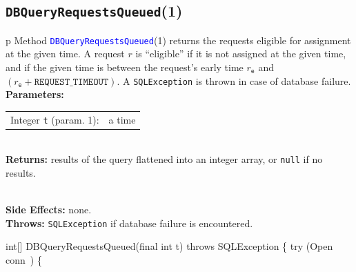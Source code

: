 \subsection{\texttt{DBQueryRequestsQueued}(1)}
\begin{tabular}{p{\textwidth}}
\toprule
{}
Method \textcolor{blue}{{\tt{}\protect{}DBQueryRequestsQueued}}(1) returns the requests
eligible for assignment at the given time. A request $r$ is ``eligible'' if it
is not assigned at the given time, and if the given time is between the
request's early time $r_\texttt{e}$ and
$(r_\texttt{e}+\texttt{REQUEST\_TIMEOUT})$.
A {\tt{}SQLException} is thrown in case of database failure.\\
\midrule
\textbf{Parameters:} \\
\begin{tabular}{lp{116mm}}
Integer {\tt{}t} (param. 1):&a time
\end{tabular}\\
\textbf{Returns:} results of the query flattened into an integer array, or
{\tt{}null} if no results.

\\
\textbf{Side Effects:} none.\\
\textbf{Throws:} {\tt{}SQLException} if database failure is encountered.\\
\bottomrule
\end{tabular}
\nwenddocs{}\endmoddef{}
int[] DBQueryRequestsQueued(final int t) throws SQLException \{
  try (\LA{}Open \code{}conn\edoc{}~{\nwtagstyle{}}\RA{}) \{
\eatline
